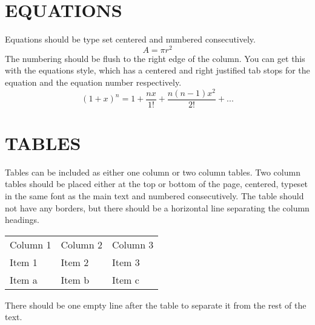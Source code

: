 \documentclass[a4paper, english, 9pt,twocolumn]{extarticle} %
\renewcommand\_[2][1]{\ifmmode _{\textnormal{\scalebox{#1}{#2}}}\else\underscore#2\fi} %
\renewcommand\^[2][1]{\ifmmode ^{\textnormal{\scalebox{#1}{#2}}}\else\xor#2\fi} %
\begin{document}
\section*{EQUATIONS}
Equations should be type set centered and numbered consecutively.
\begin{equation} %
    A = \pi r^2
\end{equation}
The numbering should be flush to the right edge of the column. You can get this with the equations style, which has a centered and right justified tab stops for the equation and the equation number respectively.
\begin{equation}
    (1+x)^n = 1 + \frac{nx}{1!}+\frac{n(n-1)x^2}{2!}+...
\end{equation}

\section*{TABLES}
Tables can be included as either one column or two column tables. Two column tables should be placed either at the top or bottom of the page, centered, typeset in the same font as the main text and numbered consecutively. The table should not have any borders, but there should be a horizontal line separating the column headings.


\begin{center}
\label{tab:ExampleTable}
\begin{tabularx}{\columnwidth}{XXX} %
\hline
Column 1 & Column 2 & Column 3 \\
\hhline{===} %
Item 1   & Item 2   & Item 3   \\
Item a   & Item b   & Item c   \\
\hline
\end{tabularx}
\end{center}

There should be one empty line after the table to separate it from the rest of the text.
\columnbreak %
\end{document}
